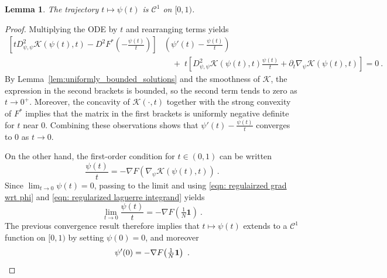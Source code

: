 \documentclass{scrartcl}
\theoremstyle{plain}
\newtheorem{lem}[thm]{Lemma}
\theoremstyle{definition}
\begin{document}
\begin{lem}
    The trajectory $t\mapsto\psi(t)$ is $\mathcal{C}^1$ on $[0,1)$.
\end{lem}
\begin{proof}
    Multiplying the ODE by $t$ and rearranging terms yields
    \begin{align}
        \left[tD^2_{\psi,\psi}\mathcal{K}(\psi(t),t)- D^2F^*\left(-\frac{\psi(t)}{t}\right)\right] &\left(\psi'(t)-\frac{\psi(t)}{t}\right) \nonumber\\[4pt]
        &\quad +\; t\left[D^2_{\psi,\psi}\mathcal{K}(\psi(t),t)\frac{\psi(t)}{t}+\partial_t\nabla_\psi\mathcal{K}(\psi(t),t)\right]= 0\ .\label{eqn: rearranged ODE}
    \end{align}
    By Lemma~\ref{lem:uniformly_bounded_solutions} and the smoothness of $\mathcal{K}$, the expression in the second brackets is bounded, so the second term tends to zero as $t\to 0^+$. Moreover, the concavity of $\mathcal{K}(\cdot,t)$ together with the strong convexity of $F^*$ implies that the matrix in the first brackets is uniformly negative definite for $t$ near $0$. Combining these observations shows that $\psi'(t)-\frac{\psi(t)}{t}$ converges to $0$ as $t\to 0$.
    
    On the other hand, the first-order condition for $t\in(0,1)$ can be written
    \[
        \frac{\psi(t)}{t}=-\nabla F(\nabla_\psi \mathcal{K}(\psi(t),t))\ .
    \]
    Since $\lim_{t\to0}\psi(t)=0$, passing to the limit and using \eqref{eqn: regulairzed grad wrt phi} and \eqref{eqn: regularized laguerre integrand} yields
  \begin{equation}\label{eqn: limit of z}
        \lim_{t\to0}\frac{\psi(t)}{t}= -\nabla F\!\left(\tfrac{1}{N}\mathbf 1\right)\ .
 \end{equation}
    The previous convergence result therefore implies that $t\mapsto \psi(t)$ extends to a $\mathcal{C}^1$ function on $[0,1)$ by setting $\psi(0)=0$, and moreover
\begin{equation}\label{eqn: initial derivative}
    \psi'(0)=-\nabla F\!\left(\tfrac{1}{N}\mathbf 1\right)\ .\qedhere
\end{equation}
\end{proof}
\end{document}
